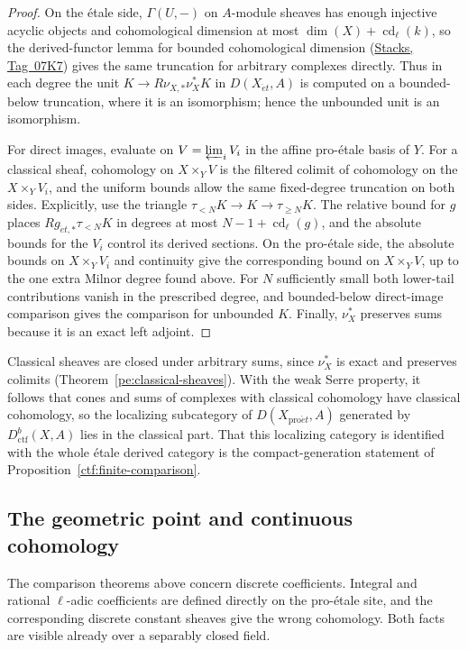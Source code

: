 \documentclass[11pt,a4paper]{article}
\numberwithin{equation}{section}
\theoremstyle{definition}
\theoremstyle{remark}
\newcommand{\et}{\acute{e}t}
\newcommand{\proet}{\mathrm{pro}\acute{e}t}
\newcommand{\stacks}[1]{\href{https://stacks.math.columbia.edu/tag/#1}{\textnormal{Stacks, Tag~#1}}}
\newcommand{\Dctf}{D^b_{\mathrm{ctf}}}
\begin{document}
\begin{proof}
On the \'etale side, $\Gamma(U,-)$ on $A$-module sheaves has enough
injective acyclic objects and cohomological dimension at most
$\dim(X)+\operatorname{cd}_\ell(k)$, so
the derived-functor lemma for bounded cohomological dimension
(\stacks{07K7}) gives the same truncation for arbitrary complexes
directly. Thus in each degree the unit $K\to R\nu_{X,*}\nu_X^*K$ in
$D(X_{\et},A)$ is computed on a bounded-below truncation, where it is an isomorphism; hence the unbounded unit is an
isomorphism.

For direct images, evaluate on $V=\varprojlim_iV_i$ in the affine
pro-\'etale basis of $Y$. For a classical sheaf, cohomology on
$X\times_YV$ is the filtered colimit of cohomology on the
$X\times_YV_i$, and the uniform bounds allow the same fixed-degree
truncation on both sides. Explicitly, use the triangle
$\tau_{<N}K\to K\to\tau_{\geq N}K$. The relative bound for $g$ places
$Rg_{\et,*}\tau_{<N}K$ in degrees at most
$N-1+\operatorname{cd}_\ell(g)$, and the absolute bounds for the $V_i$
control its derived sections. On the pro-\'etale side, the absolute
bounds on $X\times_YV_i$ and continuity give the corresponding bound on
$X\times_YV$, up to the one extra Milnor degree found above. For $N$
sufficiently small both lower-tail contributions vanish in the
prescribed degree, and bounded-below direct-image comparison gives the
comparison for unbounded $K$. Finally, $\nu_X^*$ preserves sums
because it is an exact left adjoint.
\end{proof}

Classical sheaves are closed under arbitrary sums, since $\nu_X^*$ is
exact and preserves colimits (Theorem~\ref{pe:classical-sheaves}).
With the weak Serre property, it follows that cones and sums of
complexes with classical cohomology have classical cohomology, so the
localizing subcategory of $D(X_{\proet},A)$ generated by $\Dctf(X,A)$
lies in the classical part. That this localizing category is
identified with the whole \'etale derived category is the
compact-generation statement of Proposition~\ref{ctf:finite-comparison}.

\subsection{The geometric point and continuous cohomology}
\label{pe:coefficient-bridge}

The comparison theorems above concern discrete coefficients. Integral
and rational $\ell$-adic coefficients are defined directly on the
pro-\'etale site, and the corresponding discrete constant sheaves give
the wrong cohomology. Both facts are visible already over a separably
closed field.
\end{document}
